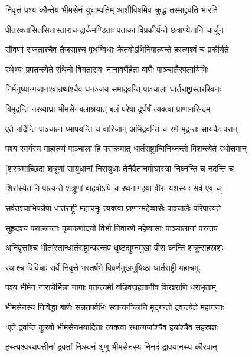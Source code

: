 \twolineshloka
{निवृत्तं पश्य कौन्तेय भीमसेनं युधाम्पतिम्}
{आशीविषमिव क्रुद्धं तस्माद्द्रवति भारति}


\twolineshloka
{पीतरक्तासितसितास्ताराचन्द्रार्कमण्डिताः}
{पताका विप्रकीर्यन्ते छत्राण्येतानि चार्जुन}


\twolineshloka
{सौवर्णा राजताश्चैव तैजसाश्च पृथग्विधाः}
{केतवोऽभिनिपात्यन्ते हस्त्यश्वं च प्रकीर्यते}


\twolineshloka
{रथेभ्यः प्रपतन्त्येते रथिनो विगतासवः}
{नानावर्णैर्हता बाणैः पाञ्चालैरपलायिभिः}


\twolineshloka
{निर्मनुष्यान्गजानश्वान्रथांश्चैव धनञ्जय}
{समाद्रवन्ति पाञ्चाला धार्तराष्ट्रांस्तरस्विनः}


\twolineshloka
{विमृद्रन्ति नरव्याघ्रा भीमसेनबलाश्रयात्}
{बलं परेषां दुर्धर्षं त्यक्त्वा प्राणानरिन्दम्}


\twolineshloka
{एते नर्दिन्ति पाञ्चाला ध्मापयन्ति च वारिजान्}
{अभिद्रवन्ति च रणे मृद्रन्तः सायकैः परान्}


\twolineshloka
{पश्य स्वर्गस्य माहात्म्यं पाञ्चाला हि पराक्रमात्}
{धार्तराष्ट्रान्विनिघ्नन्तो विशन्त्येते रथोत्तमान्}


\twolineshloka
{[शस्त्रमाच्छिद्य शत्रूणां सायुधानां निरायुधाः}
{तेनैवैतानमोघास्त्रा निघ्नन्ति च नदन्ति च}


\twolineshloka
{शिरांस्येतानि पात्यन्ते शत्रूणां बाहवोऽपि च}
{रथनागहया वीरा यशस्याः सर्व एव च]}


\twolineshloka
{सर्वतश्चाभिपन्नैषा धार्तराष्ट्री महाचमूः}
{त्यक्त्वा प्राणान्महेष्वासैः पाञ्चालैः परिपात्यते}


\twolineshloka
{सुहृदश्च पराक्रान्ताः कृपकर्णादयो विभो}
{निवारणे महेष्वासाः पाञ्चालानां परन्तप}


\twolineshloka
{अनिवृत्तांश्च भीतांस्तान्धार्तराष्ट्रान्परन्तप}
{धृष्टद्युम्नमुखा वीरा घ्नन्ति शत्रून्सहस्रशः}


\twolineshloka
{रथाश्च विविधाः सर्वे निवृत्ते भरतर्षभे}
{विवर्णमुखभूयिष्ठा धार्तराष्ट्री महाचमूः}


\twolineshloka
{पश्य भीमेन नाराचैर्भिन्ना नागाः पतन्त्यमी}
{वज्रिवज्रहतानीव शिखराणि धराभृताम्}


\twolineshloka
{भीमसेनस्य निर्विद्धा बाणैः सन्नतपर्वभिः}
{स्वान्यनीकानि मृद्गन्तो द्रवन्त्येते महागजाः}


\twolineshloka
{`एते द्रवन्ति कुरवो भीमसेनभयार्दिताः}
{त्यक्त्वा रथान्गजांश्चैव हयांश्चैव सहस्रशः}


\twolineshloka
{हस्त्यश्वरथपत्तीनां द्रवतां निःस्वनं शृणु}
{भीमसेनस्य निनदं द्रावयानस्य कौरवान्}


